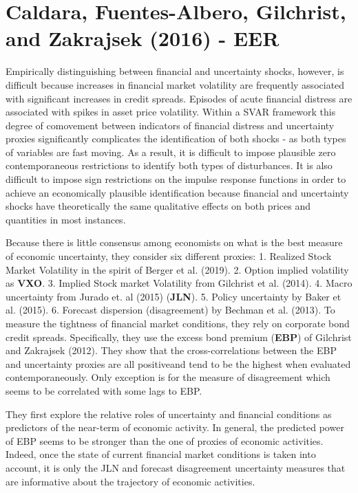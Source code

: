 \documentclass{article}
\begin{document}
{\section*{Caldara, Fuentes-Albero, Gilchrist, and Zakrajsek (2016) - EER}

Empirically distinguishing between financial and uncertainty shocks, however, is difficult because increases in financial market volatility are frequently associated with significant increases in credit spreads. Episodes of acute financial distress are associated with spikes in asset price volatility. Within a SVAR framework this degree of comovement between indicators of financial distress and uncertainty proxies significantly complicates the identification of both shocks - as both types of variables are fast moving. As a result, it is difficult to impose plausible zero contemporaneous restrictions to identify both types of disturbances. It is also difficult to impose sign restrictions on the impulse response functions in order to achieve an economically plausible identification because financial and uncertainty shocks have theoretically the same qualitative effects on both prices and quantities in most instances.  


Because there is little consensus among economists on what is the best measure of economic uncertainty, they consider six different proxies: 1. Realized Stock Market Volatility in the spirit of Berger et al. (2019). 2. Option implied volatility as \textbf{VXO}. 3. Implied Stock market Volatility from Gilchrist et al. (2014). 4. Macro uncertainty from Jurado et. al (2015) (\textbf{JLN}). 5. Policy uncertainty by Baker et al. (2015). 6. Forecast dispersion (disagreement) by Bechman et al. (2013). To measure the tightness of financial market conditions, they rely on corporate bond credit spreads. Specifically, they use the excess bond premium (\textbf{EBP}) of Gilchrist and Zakrajsek (2012). They show that the cross-correlations between the EBP and uncertainty proxies are all positiveand tend to be the highest when evaluated contemporaneously. Only exception is for the measure of disagreement which seems to be correlated with some lags to EBP. 

They first explore the relative roles of uncertainty and financial conditions as predictors of the near-term of economic activity. In general, the predicted power of EBP seems to be stronger than the one of proxies of economic activities. Indeed, once the state of current financial market conditions is taken into account, it is only the JLN and forecast disagreement uncertainty measures that are informative about the trajectory of economic activities. 

}
\end{document}
